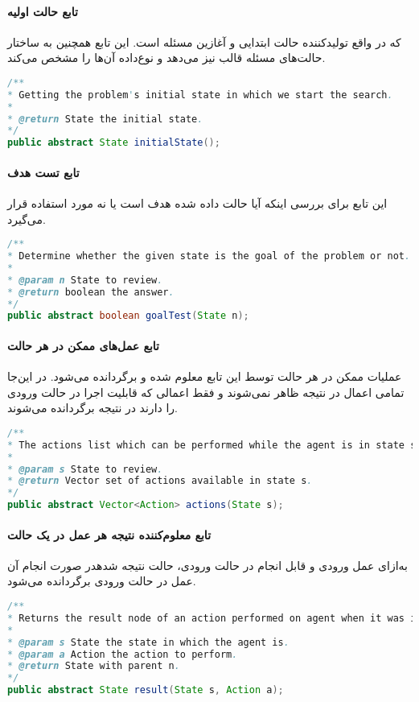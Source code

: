 	\paragraph{تابع حالت اولیه}
	که در واقع تولیدکننده حالت ابتدایی و آغازین مسئله است. این تابع همچنین به ساختار حالت‌های مسئله قالب نیز می‌دهد و نوع‌داده آن‌ها را مشخص می‌کند.
	\begin{latin}
		\begin{lstlisting}[language=Java]
/**
* Getting the problem's initial state in which we start the search.
*
* @return State the initial state.
*/
public abstract State initialState();
\end{lstlisting}
	\end{latin}
	\paragraph{تابع تست هدف}
	این تابع برای بررسی اینکه آیا حالت داده شده هدف است یا نه مورد استفاده قرار می‌گیرد.
		\begin{latin}
		\begin{lstlisting}[language=Java]
/**
* Determine whether the given state is the goal of the problem or not.
*
* @param n State to review.
* @return boolean the answer.
*/
public abstract boolean goalTest(State n);
\end{lstlisting}
	\end{latin}
	\paragraph{تابع عمل‌های ممکن در هر حالت}
	عملیات ممکن در هر حالت توسط این تابع معلوم شده و برگردانده می‌شود. در این‌جا تمامی اعمال در نتیجه ظاهر نمی‌شوند و فقط اعمالی که قابلیت اجرا در حالت ورودی را دارند در نتیجه برگردانده می‌شوند.
		\begin{latin}
	\begin{lstlisting}[language=Java]
/**
* The actions list which can be performed while the agent is in state s.
*
* @param s State to review.
* @return Vector set of actions available in state s.
*/
public abstract Vector<Action> actions(State s);
\end{lstlisting}
	\end{latin}

	\paragraph{تابع معلوم‌کننده نتیجه هر عمل در یک حالت}
	به‌ازای عمل ورودی و قابل انجام در حالت ورودی، حالت نتیجه شدهدر صورت انجام آن عمل در حالت ورودی برگردانده می‌شود.
	\begin{latin}
		\begin{lstlisting}[language=Java]
/**
* Returns the result node of an action performed on agent when it was in state s.
*
* @param s State the state in which the agent is.
* @param a Action the action to perform.
* @return State with parent n.
*/
public abstract State result(State s, Action a);
\end{lstlisting}
	\end{latin}
	
